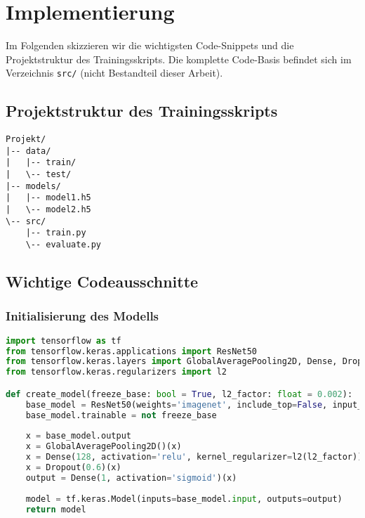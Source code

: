 \chapter{Implementierung}
\label{chap:implementierung}

Im Folgenden skizzieren wir die wichtigsten Code-Snippets und die Projektstruktur des Trainingsskripts. Die komplette Code‐Basis befindet sich im Verzeichnis \texttt{src/} (nicht Bestandteil dieser Arbeit). 

\section{Projektstruktur des Trainingsskripts}
\begin{verbatim}
Projekt/
|-- data/
|   |-- train/
|   \-- test/
|-- models/
|   |-- model1.h5
|   \-- model2.h5
\-- src/
    |-- train.py
    \-- evaluate.py
\end{verbatim}


\section{Wichtige Codeausschnitte}
\subsection{Initialisierung des Modells}
\begin{lstlisting}[language=Python, caption=ResNet50-Modell-Definition aus \texttt{train\_model.py}]
import tensorflow as tf
from tensorflow.keras.applications import ResNet50
from tensorflow.keras.layers import GlobalAveragePooling2D, Dense, Dropout
from tensorflow.keras.regularizers import l2

def create_model(freeze_base: bool = True, l2_factor: float = 0.002):
    base_model = ResNet50(weights='imagenet', include_top=False, input_shape=(256,256,3))
    base_model.trainable = not freeze_base
    
    x = base_model.output
    x = GlobalAveragePooling2D()(x)
    x = Dense(128, activation='relu', kernel_regularizer=l2(l2_factor))(x)
    x = Dropout(0.6)(x)
    output = Dense(1, activation='sigmoid')(x)
    
    model = tf.keras.Model(inputs=base_model.input, outputs=output)
    return model
\end{lstlisting}

